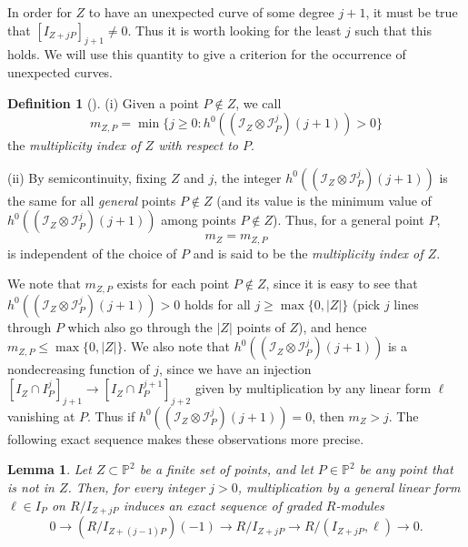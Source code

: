 \documentclass[12pt]{amsart}
\numberwithin{equation}{section}
\newtheorem{lemma}[theorem]{Lemma}
\theoremstyle{definition}
\newtheorem{definition}[theorem]{Definition}
\begin{document}
In order for $Z$ to have an unexpected curve of some degree $j+1$,
it must be true that $[I_{Z+jP}]_{j+1}\neq0$. Thus it is worth looking for the 
least $j$ such that this holds. We will use this quantity to give 
a criterion for the occurrence of unexpected curves.

\begin{definition}[{\cite[Definition 4.1]{FV2}}]
    \label{def:mult ind}
(i) Given a point $P \notin Z$, we call 
\[
m_{Z, P} = \min\{j \ge 0 : h^0((\mathcal I_Z \otimes \mathcal I_P^j)(j+1)) > 0\}
\]    
the \emph{multiplicity index of $Z$ with respect to $P$}. 

(ii) By semicontinuity, fixing $Z$ and $j$, the integer $h^0((\mathcal I_Z \otimes \mathcal I_P^j)(j+1))$ 
is the same for all \emph{general} points $P \notin Z$ (and its value is the minimum value of
$h^0((\mathcal I_Z \otimes \mathcal I_P^j)(j+1))$ among points $P\notin Z$). Thus, for a general point $P$, 
\[
m_Z = m_{Z, P} 
\] 
is independent of the choice of $P$ and 
is said to be the \emph{multiplicity index of $Z$}.
\end{definition} 

We note that $m_{Z,P}$ exists for each point $P\notin Z$, since
it is easy to see that \linebreak $h^0((\mathcal I_Z \otimes \mathcal I_P^j)(j+1)) > 0$ holds
for all $j\geq \max\{0,|Z|\}$ (pick $j$ lines through $P$ which also 
go through the $|Z|$ points of $Z$), and hence $m_{Z,P}\leq \max\{0,|Z|\}$.
We also note that $h^0((\mathcal I_Z \otimes \mathcal I_P^j)(j+1))$ is a nondecreasing function of $j$,
since we have an injection $[I_Z \cap I_P^j]_{j+1}\to [I_Z \cap I_P^{j+1}]_{j+2}$
given by multiplication by any linear form $\ell$ vanishing at $P$.
Thus if $h^0((\mathcal I_Z \otimes \mathcal I_P^j)(j+1))=0$, then $m_Z>j$. The following exact sequence makes these observations more precise.  

\begin{lemma}
    \label{lem:exact sequence}
Let $Z \subset { \ensuremath{\mathbb{P}}}^2$ be a finite set of points, and let $P \in { \ensuremath{\mathbb{P}}}^2$  be any point that is not in $Z$.  Then, for every integer $j > 0$,  multiplication by a general linear form $\ell \in I_P$ on $R/I_{Z + j P}$ induces  an exact sequence  of graded $R$-modules
\begin{equation} 
    \label{eq:exact sequence}
0 \to (R/I_{Z + (j -1)  P}) (-1) \to  R/I_{Z + j P} \to R/(I_{Z + j P}, \ell) \to 0. 
\end{equation}
\end{lemma}
\end{document}
